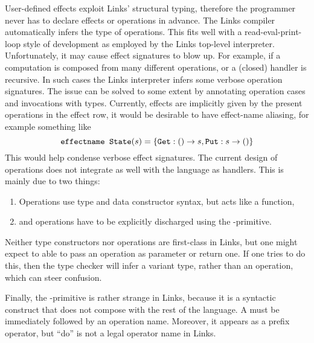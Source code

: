 User-defined effects exploit Links' structural typing, therefore the programmer never has to declare effects or operations in advance. The Links compiler automatically infers the type of operations. This fits well with a read-eval-print-loop style of development as employed by the Links top-level interpreter. Unfortunately, it may cause effect signatures to blow up. For example, if a computation is composed from many different operations, or a (closed) handler is recursive. In such cases the Links interpreter infers some verbose operation signatures. The issue can be solved to some extent by annotating operation cases and invocations with types. Currently, effects are implicitly given by the present operations in the effect row, it would be desirable to have effect-name aliasing, for example something like
\[ \texttt{effectname State}(s) = \{\texttt{Get}: () \to s, \texttt{Put}: s \to ()\} \]
This would help condense verbose effect signatures. The current design of operations does not integrate as well with the language as handlers. This is mainly due to two things:
\begin{enumerate}
  \item Operations use type and data constructor syntax, but acts like a function,
  \item and operations have to be explicitly discharged using the -primitive.
\end{enumerate}
Neither type constructors nor operations are first-class in Links, but one might expect to able to pass an operation as parameter or return one. If one tries to do this, then the type checker will infer a variant type, rather than an operation, which can steer confusion.

Finally, the -primitive is rather strange in Links, because it is a syntactic construct that does not compose with the rest of the language. A  must be immediately followed by an operation name. Moreover, it appears as a prefix operator, but ``do'' is not a legal operator name in Links. 